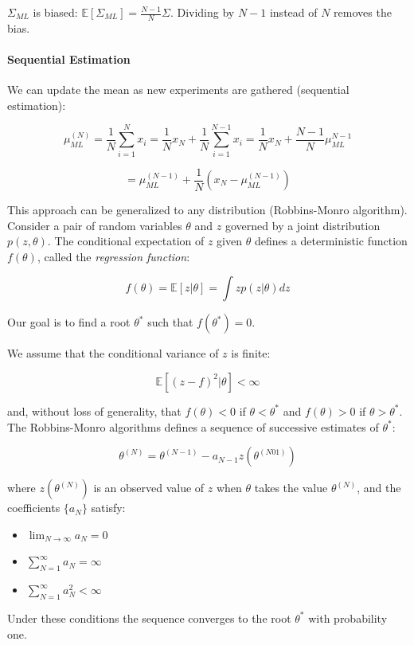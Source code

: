 \documentclass{article}
\begin{document}
\(\Sigma_{ML}\) is biased:
\(\mathbb{E}[\Sigma_{ML}] = \frac{N-1}{N}\Sigma\). Dividing by \(N-1\)
instead of \(N\) removes the bias.

\paragraph{Sequential Estimation}\label{sequential-estimation}

We can update the mean as new experiments are gathered (sequential
estimation):

\[\mu_{ML}^{(N)} = \frac{1}{N} \sum_{i=1}^N x_i = \frac{1}{N} x_N + \frac{1}{N} \sum_{i=1}^{N-1} x_i = \frac{1}{N} x_N + \frac{N-1}{N} \mu_{ML}^{N-1}\]

\[  = \mu_{ML}^{(N-1)} + \frac{1}{N} (x_N - \mu_{ML}^{(N-1)}) \]

This approach can be generalized to any distribution (Robbins-Monro
algorithm). Consider a pair of random variables \(\theta\) and \(z\)
governed by a joint distribution \(p(z, \theta)\). The conditional
expectation of \(z\) given \(\theta\) defines a deterministic function
\(f(\theta)\), called the \emph{regression function}:

\[f(\theta) = \mathbb{E}[z|\theta ] = \int zp(z|\theta ) dz\]

Our goal is to find a root \(\theta^*\) such that \(f(\theta^*) = 0\).

We assume that the conditional variance of \(z\) is finite:

\[\mathbb{E} [(z - f)^2 | \theta ] < \infty \]

and, without loss of generality, that \(f(\theta) < 0\) if
\(\theta < \theta^*\) and \(f(\theta) > 0\) if \(\theta > \theta^*\).
The Robbins-Monro algorithms defines a sequence of successive estimates
of \(\theta^*\):

\[\theta^{(N)} = \theta^{(N-1)} - a_{N-1} z(\theta^{(N01)})\]

where \(z(\theta^{(N)})\) is an observed value of \(z\) when \(\theta\)
takes the value \(\theta^{(N)}\), and the coefficients \(\{a_N\}\)
satisfy:

\begin{itemize}
\item
  \(\lim_{N \rightarrow \infty} a_N = 0\)
\item
  \(\sum_{N=1}^{\infty} a_N = \infty\)
\item
  \(\sum_{N=1}^{\infty} a_N^2 < \infty\)
\end{itemize}

Under these conditions the sequence converges to the root \(\theta^*\)
with probability one.
\end{document}
